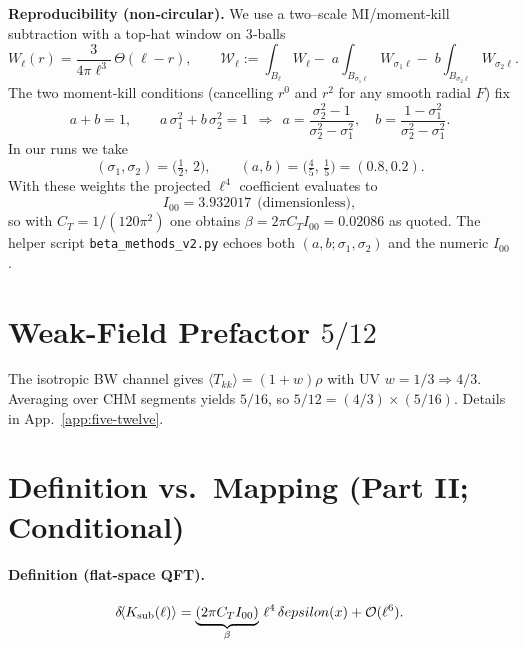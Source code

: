 \documentclass[aps,prd,onecolumn,superscriptaddress,nofootinbib]{revtex4-2}
\def\eps{epsilon}%
\providecommand{\eps}{\varepsilon}
\providecommand{\be}{\begin{equation}}
\providecommand{\ee}{\end{equation}}
\begin{document}
\noindent\textbf{Reproducibility (non‑circular).} We use a two–scale MI/moment‑kill subtraction with a top‑hat window on 3‑balls
\[
W_\ell(r)=\frac{3}{4\pi \ell^3}\,\Theta(\ell-r),\qquad
\mathcal{W}_\ell:=\int_{B_\ell}\!W_\ell-\;a\!\int_{B_{\sigma_1\ell}}\!W_{\sigma_1\ell}-\;b\!\int_{B_{\sigma_2\ell}}\!W_{\sigma_2\ell}.
\]
The two moment‑kill conditions (cancelling \(r^0\) and \(r^2\) for any smooth radial \(F\)) fix
\[
a+b=1,\qquad a\,\sigma_1^2+b\,\sigma_2^2=1
\ \ \Longrightarrow\ \
a=\frac{\sigma_2^2-1}{\sigma_2^2-\sigma_1^2},\quad
b=\frac{1-\sigma_1^2}{\sigma_2^2-\sigma_1^2}.
\]
In our runs we take
\[
(\sigma_1,\sigma_2)=\Big(\tfrac{1}{2},\,2\Big),\qquad (a,b)=\Big(\tfrac{4}{5},\,\tfrac{1}{5}\Big)=(0.8,0.2).
\]
With these weights the projected \(\ell^4\) coefficient evaluates to
\[
I_{00}=3.932017\ \ \text{(dimensionless)},
\]
so with \(C_T=1/(120\pi^2)\) one obtains \(\beta=2\pi C_T I_{00}=0.02086\) as quoted. The helper script \texttt{beta\_methods\_v2.py} echoes both \((a,b;\sigma_1,\sigma_2)\) and the numeric \(I_{00}\).

\section{Weak-Field Prefactor \texorpdfstring{$5/12$}{5/12}}
\label{sec:five-twelve}
The isotropic BW channel gives \(\langle T_{kk}\rangle=(1+w)\rho\) with UV \(w=1/3\Rightarrow 4/3\).
Averaging over CHM segments yields \(5/16\), so \(5/12=(4/3)\times(5/16)\).
Details in App.~\ref{app:five-twelve}.

\section{Definition vs.\ Mapping (Part II; Conditional)}
\label{sec:def-vs-map}

\paragraph{Definition (flat-space QFT).}
\be
\label{eq:eps-def}
\delta\!\langle K_{\rm sub}(\ell)\rangle=\underbrace{(2\pi C_T I_{00})}_{\beta}\,\ell^4\,\delta\eps(x)+\mathcal O(\ell^6).
\ee
\end{document}
